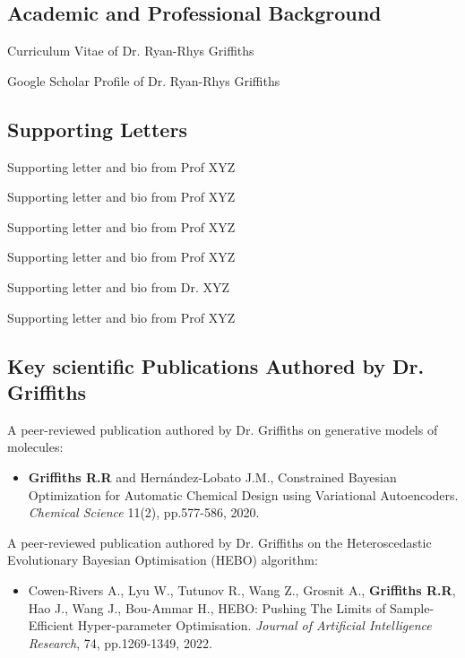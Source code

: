 \documentclass[11pt]{article}
\begin{document}
\begin{thebibliography}{9}

\subsection*{Academic and Professional Background}

Curriculum Vitae of Dr. Ryan-Rhys Griffiths


Google Scholar Profile of Dr. Ryan-Rhys Griffiths 


\subsection*{Supporting Letters}

Supporting letter and bio from Prof XYZ

Supporting letter and bio from Prof XYZ

Supporting letter and bio from Prof XYZ

Supporting letter and bio from Prof XYZ

Supporting letter and bio from Dr. XYZ

Supporting letter and bio from Prof XYZ

\subsection*{Key scientific Publications Authored by Dr. Griffiths}

A peer-reviewed publication authored by Dr. Griffiths on generative models of molecules:
\begin{itemize}
\item \textbf{Griffiths R.R} and Hern\'andez-Lobato J.M., Constrained Bayesian Optimization for Automatic Chemical Design using Variational Autoencoders. \textit{Chemical Science} 11(2), pp.577-586, 2020.
\end{itemize}

A peer-reviewed publication authored by Dr. Griffiths on the Heteroscedastic Evolutionary Bayesian Optimisation (HEBO) algorithm:
\begin{itemize}
 \item Cowen-Rivers A., Lyu W., Tutunov R., Wang Z., Grosnit A., \textbf{Griffiths R.R}, Hao J., Wang J., Bou-Ammar H., HEBO: Pushing The Limits of Sample-Efficient Hyper-parameter Optimisation. \textit{Journal of Artificial Intelligence Research}, 74, pp.1269-1349, 2022.
\end{itemize}


\end{thebibliography}
\end{document}
